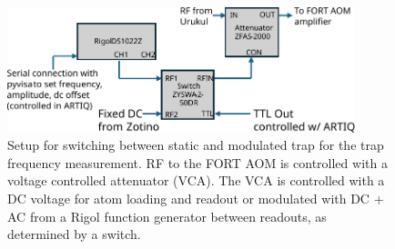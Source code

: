\begin{figure}[!ht]
    \centering
    \includegraphics[width=0.9\textwidth]{Images/network_trap_frequency_electronics.pdf}
    \caption{Setup for switching between static and modulated trap for the trap frequency measurement. RF to the FORT AOM is controlled with a voltage controlled attenuator (VCA). The VCA is controlled with a DC voltage for atom loading and readout or modulated with DC + AC from a Rigol function generator between readouts, as determined by a switch.}
    \label{fig:networktrapfrequencyelectronics}
\end{figure}

